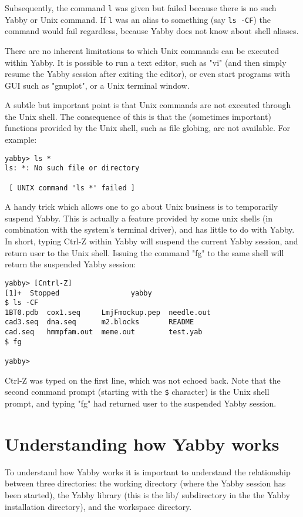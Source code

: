Subsequently, the command {\tt l} was given but failed because
there is no such Yabby or Unix command. If {\tt l} was an alias
to something (say {\tt ls -CF}) the command would fail regardless,
because Yabby does not know about shell aliases.

There are no inherent limitations to which Unix commands can be
executed within Yabby. It is possible to run a text editor, such
as "vi" (and then simply resume the Yabby session after exiting
the editor), or even start programs with GUI such as "gnuplot",
or a Unix terminal window.

A subtle but important point is that Unix commands are not executed
through the Unix shell.  The consequence of this is that the
(sometimes important) functions provided by the Unix shell, such
as file globing, are not available. For example:

\begin{verbatim}
yabby> ls *
ls: *: No such file or directory

 [ UNIX command 'ls *' failed ]
\end{verbatim}

A handy trick which allows one to go about Unix business is
to temporarily suspend Yabby. This is actually a feature provided
by some unix shells (in combination with the system's terminal driver),
and has little to do with Yabby. In short, typing Ctrl-Z within
Yabby will suspend the current Yabby session, and return user
to the Unix shell. Issuing the command "fg" to the same shell
will return the suspended Yabby session:

\begin{verbatim}
yabby> [Cntrl-Z]
[1]+  Stopped                 yabby
$ ls -CF
1BT0.pdb  cox1.seq     LmjFmockup.pep  needle.out
cad3.seq  dna.seq      m2.blocks       README
cad.seq   hmmpfam.out  meme.out        test.yab
$ fg

yabby>
\end{verbatim}

Ctrl-Z was typed on the first line, which was not echoed back. Note
that the second command prompt (starting with the {\tt \$} character)
is the Unix shell prompt, and typing "fg" had returned user to
the suspended Yabby session.

\section{Understanding how Yabby works}

To understand how Yabby works it is important to understand the
relationship between three directories: the working directory
(where the Yabby session has been started), the Yabby library (this
is the lib/ subdirectory in the the Yabby installation directory),
and the workspace directory.

